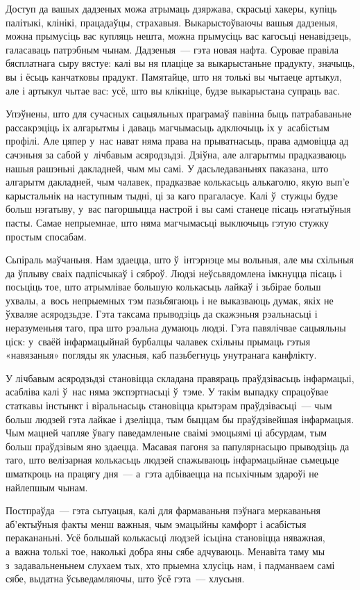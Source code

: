 Доступ да вашых дадзеных можа атрымаць дзяржава, скрасьці хакеры, купіць палітыкі, клінікі, працадаўцы, страхавыя. Выкарыстоўваючы вашыя дадзеныя, можна прымусіць вас купляць нешта, можна прымусіць вас кагосьці ненавідзець, галасаваць патрэбным чынам. Дадзеныя~--- гэта новая нафта. Суровае правіла бясплатнага сыру вястуе: калі вы ня плаціце за выкарыстаньне прадукту, значыць, вы і ёсьць канчатковы прадукт. Памятайце, што ня толькі вы чытаеце артыкул, але і артыкул чытае вас: усё, што вы клікніце, будзе выкарыстана супраць вас.

Упэўнены, што для сучасных сацыяльных праграмаў павінна быць патрабаваньне рассакрэціць іх алгарытмы і даваць магчымасьць адключыць іх у~асабістым профілі. Але цяпер у~нас нават няма права на прыватнасьць, права адмовіцца ад сачэньня за сабой у~лічбавым асяродзьдзі. Дзіўна, але алгарытмы прадказваюць нашыя рашэньні дакладней, чым мы самі. У дасьледаваньнях паказана, што алгарытм дакладней, чым чалавек, прадказвае колькасьць алькаголю, якую вып'е карыстальнік на наступным тыдні, ці за каго прагаласуе. Калі ў~стужцы будзе больш нэгатыву, у~вас пагоршыцца настрой і вы самі станеце пісаць нэгатыўныя пасты. Самае непрыемнае, што няма магчымасьці выключыць гэтую стужку простым спосабам.

Сьпіраль маўчаньня. Нам здаецца, што ў~інтэрнэце мы вольныя, але мы схільныя да ўплыву сваіх падпісчыкаў і сяброў. Людзі неўсьвядомлена імкнуцца пісаць і посьціць тое, што атрымлівае большую колькасьць лайкаў і зьбірае больш ухвалы, а~вось непрыемных тэм пазьбягаюць і не выказваюць думак, якіх не ўхваляе асяродзьдзе. Гэта таксама прыводзіць да скажэньня рэальнасьці і неразуменьня таго, пра што рэальна думаюць людзі. Гэта павялічвае сацыяльны ціск: у~сваёй інфармацыйнай бурбалцы чалавек схільны прымаць гэтыя «навязаныя» погляды як уласныя, каб пазьбегнуць унутранага канфлікту.

У лічбавым асяродзьдзі становіцца складана правяраць праўдзівасьць інфармацыі, асабліва калі ў~нас няма экспэртнасьці ў~тэме. У такім выпадку спрацоўвае статкавы інстынкт і віральнасьць становіцца крытэрам праўдзівасьці~--- чым больш людзей гэта лайкае і дзеліцца, тым быццам бы праўдзівейшая інфармацыя. Чым мацней чапляе ўвагу паведамленьне сваімі эмоцыямі ці абсурдам, тым больш праўдзівым яно здаецца. Масавая пагоня за папулярнасьцю прыводзіць да таго, што велізарная колькасьць людзей спажываюць інфармацыйнае сьмецьце шматкроць на працягу дня~--- а~гэта адбіваецца на псыхічным здароўі не найлепшым чынам.

Постпраўда~--- гэта сытуацыя, калі для фармаваньня пэўнага меркаваньня аб'ектыўныя факты менш важныя, чым эмацыйны камфорт і асабістыя перакананьні. Усё большай колькасьці людзей ісьціна становіцца няважная, а~важна толькі тое, наколькі добра яны сябе адчуваюць. Менавіта таму мы з~задавальненьнем слухаем тых, хто прыемна хлусіць нам, і падманваем самі сябе, выдатна ўсьведамляючы, што ўсё гэта~--- хлусьня.

